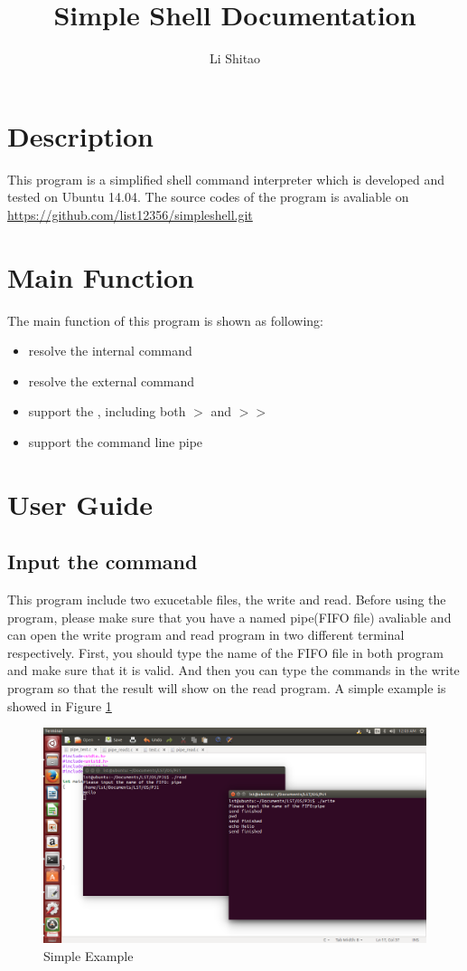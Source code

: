 \documentclass{article}
\begin{document}
\title{Simple Shell Documentation}
\author{Li Shitao}
\maketitle
\section{Description}
This program is a simplified shell command interpreter which is developed and tested on Ubuntu 14.04. The source codes of the program is avaliable on \url{https://github.com/list12356/simpleshell.git}
\section{Main Function}
The main function of this program is shown as following:
\begin{itemize}
\item resolve the internal command
\item resolve the external command
\item support the , including both $>$ and $>>$
\item support the command line pipe
\end{itemize}
\section{User Guide}
\subsection{Input the command}
This program include two exucetable files, the write and read. Before using the program, please make sure that you have a named pipe(FIFO file) avaliable and can open the write program and read program in two different terminal respectively. First, you should type the name of the FIFO file in both program and make sure that it is valid. And then you can type the commands in the write program so that the result will show on the read program. A simple example is showed in Figure \ref{fig:a}
\begin{figure}[htbp]
\label{fig:a}
\includegraphics[width =400pt ,keepaspectratio ]{1.png}
\caption{Simple Example}
\end{figure}
\end{document}
